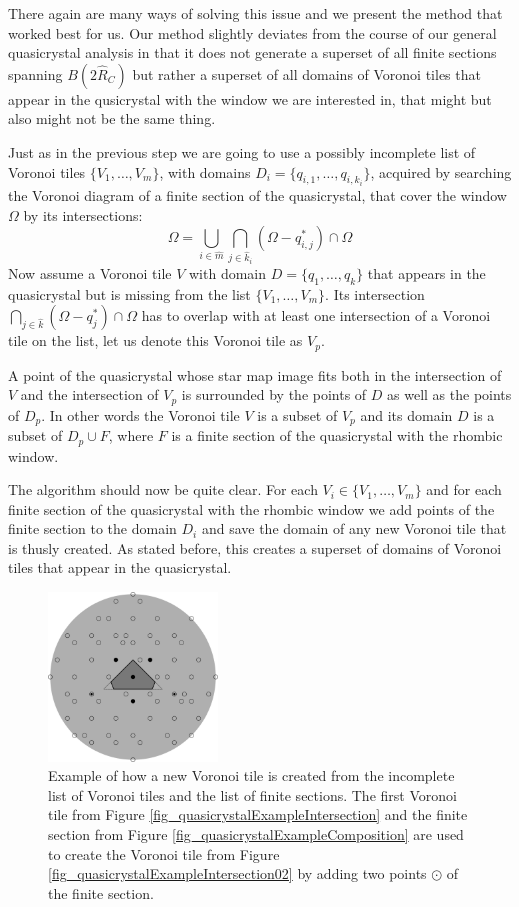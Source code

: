 \documentclass[text.tex]{subfiles}
\begin{document}
There again are many ways of solving this issue and we present the method that worked best for us. Our method slightly deviates from the course of our general quasicrystal analysis in that it does not generate a superset of all finite sections spanning $B(2\hat{R}_C)$ but rather a superset of all domains of Voronoi tiles that appear in the qusicrystal with the window we are interested in, that might but also might not be the same thing. 

Just as in the previous step we are going to use a possibly incomplete list of Voronoi tiles $\{V_1,\dots,V_m\}$, with domains $D_i = \{q_{i,1},\dots,q_{i,k_i}\}$, acquired by searching the Voronoi diagram of a finite section of the quasicrystal, that cover the window $\Omega$ by its intersections:
$$\Omega = \bigcup\limits_{i\in\hat{m}}\bigcap\limits_{j\in\hat{k}_i}(\Omega-q_{i,j}^\ast)\cap\Omega$$ 
Now assume a Voronoi tile $V$ with domain $D = \{q_1,\dots,q_k\}$ that appears in the quasicrystal but is missing from the list $\{V_1,\dots,V_m\}$. Its intersection $\bigcap_{j\in\hat{k}}(\Omega-q_j^\ast)\cap\Omega$ has to overlap with at least one intersection of a Voronoi tile on the list, let us denote this Voronoi tile as $V_p$. 

A point of the quasicrystal whose star map image fits both in the intersection of $V$ and the intersection of $V_p$ is surrounded by the points of $D$ as well as the points of $D_p$. In other words the Voronoi tile $V$  is a subset of $V_p$ and its domain $D$ is a subset of $D_p\cup F$, where $F$ is a finite section of the quasicrystal with the rhombic window. 

The algorithm should now be quite clear. For each $V_i\in\{V_1,\dots,V_m\}$ and for each finite section of the quasicrystal with the rhombic window we add points of the finite section to the domain $D_i$ and save the domain of any new Voronoi tile that is thusly created. As stated before, this creates a superset of domains of Voronoi tiles that appear in the quasicrystal. 

\begin{figure}[h!]
\centering
\includegraphics[width=0.4\textwidth]{img/2D/cropByFiniteSection}
\caption{Example of how a new Voronoi tile is created from the incomplete list of Voronoi tiles and the list of finite sections. The first Voronoi tile from Figure \ref{fig_quasicrystalExampleIntersection} and the finite section from Figure \ref{fig_quasicrystalExampleComposition} are used to create the Voronoi tile from Figure \ref{fig_quasicrystalExampleIntersection02} by adding two points $\odot$ of the finite section. }
\label{fig_quasicrystalExampleNewTile}
\end{figure}
\end{document}
